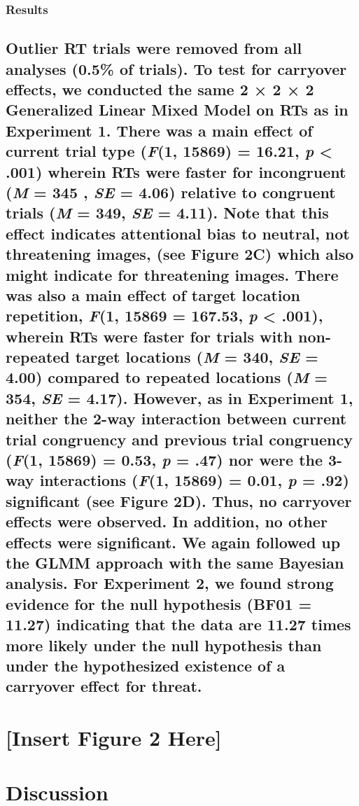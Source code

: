 \documentclass{article}
\begin{document}
	\subsubsection{Results}



	\subsection{{\color{4472C4}Outlier RT trials were removed from all analyses }(0.5\% of trials). To test for carryover effects, we conducted the same 2 × 2 × 2 Generalized Linear Mixed Model on RTs as in Experiment 1. There was a main effect of current trial type (\emph{F}(1, 15869) = 16.21, \emph{p }< .001) wherein RTs were faster for incongruent (\emph{M }= 345 , \emph{SE }= 4.06) relative to congruent trials (\emph{M }= 349, \emph{SE }= 4.11). Note that this effect indicates attentional bias to neutral, not threatening images, (see Figure 2C) which also might indicate for threatening images. There was also a main effect of target location repetition, \emph{F}(1, 15869 = 167.53, \emph{p }< .001), wherein RTs were faster for trials with non-repeated target locations (\emph{M }= 340, \emph{SE }= 4.00) compared to repeated locations (\emph{M }= 354, \emph{SE }= 4.17). However, as in Experiment 1, neither the 2-way interaction between current trial congruency and previous trial congruency (\emph{F}(1, 15869) = 0.53, \emph{p }= .47) nor were the 3-way interactions (\emph{F}(1, 15869) = 0.01, \emph{p }= .92) significant {\color{4472C4}(see Figure 2D). }Thus, no carryover effects were observed. In addition, no other effects were significant. We again followed up the GLMM approach with the same Bayesian analysis. For Experiment 2, we found strong evidence for the null hypothesis (BF01 = 11.27) indicating that the data are 11.27 times more likely under the null hypothesis than under the hypothesized existence of a carryover effect for threat. }



	\section{\textbf{[Insert Figure 2 Here]}}



	\section{Discussion}
\end{document}
